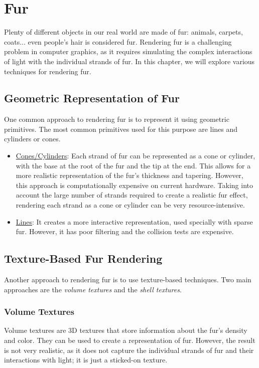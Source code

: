 \chapter{Fur}

Plenty of different objects in our real world are made of fur: animals, carpets, coats... even people's hair is considered fur. Rendering fur is a challenging problem in computer graphics, as it requires simulating the complex interactions of light with the individual strands of fur. In this chapter, we will explore various techniques for rendering fur.

\section{Geometric Representation of Fur}

One common approach to rendering fur is to represent it using geometric primitives. The most common primitives used for this purpose are lines and cylinders or cones.
\begin{itemize}
    \item \ul{Cones/Cylinders}: Each strand of fur can be represented as a cone or cylinder, with the base at the root of the fur and the tip at the end. This allows for a more realistic representation of the fur's thickness and tapering. However, this approach is computationally expensive on current hardware. Taking into account the large number of strands required to create a realistic fur effect, rendering each strand as a cone or cylinder can be very resource-intensive.
    \item \ul{Lines}: It creates a more interactive representation, used specially with sparse fur. However, it has poor filtering and the collision tests are expensive.
\end{itemize}

\section{Texture-Based Fur Rendering}

Another approach to rendering fur is to use texture-based techniques. Two main approaches are the \emph{volume textures} and the \emph{shell textures}.

\subsection{Volume Textures}

Volume textures are 3D textures that store information about the fur's density and color. They can be used to create a representation of fur. However, the result is not very realistic, as it does not capture the individual strands of fur and their interactions with light; it is just a sticked-on texture.

